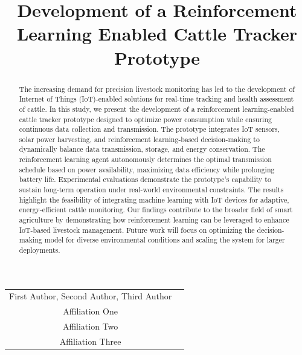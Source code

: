 \documentclass[10pt]{cai}
\begin{document}
\def\conferenceyear{2025}
\begin{center}

\title{Development of a Reinforcement Learning Enabled Cattle Tracker Prototype}
\maketitle

\thispagestyle{empty}

\begin{tabular}{cc}
First Author\upstairs{\affilone,*}, Second Author\upstairs{\affilone}, Third Author\upstairs{\affilthree}
\\[0.25ex]
{\small \upstairs{\affilone} Affiliation One} \\
{\small \upstairs{\affiltwo} Affiliation Two} \\
{\small \upstairs{\affilthree} Affiliation Three} \\
\end{tabular}
  
\vspace*{0.2in}
\end{center}

\begin{abstract}
The increasing demand for precision livestock monitoring has led to the development of Internet of Things (IoT)-enabled solutions for real-time tracking and health assessment of cattle. In this study, we present the development of a reinforcement learning-enabled cattle tracker prototype designed to optimize power consumption while ensuring continuous data collection and transmission. The prototype integrates IoT sensors, solar power harvesting, and reinforcement learning-based decision-making to dynamically balance data transmission, storage, and energy conservation. 
The reinforcement learning agent autonomously determines the optimal transmission schedule based on power availability, maximizing data efficiency while prolonging battery life. Experimental evaluations demonstrate the prototype's capability to sustain long-term operation under real-world environmental constraints. The results highlight the feasibility of integrating machine learning with IoT devices for adaptive, energy-efficient cattle monitoring.
Our findings contribute to the broader field of smart agriculture by demonstrating how reinforcement learning can be leveraged to enhance IoT-based livestock management. Future work will focus on optimizing the decision-making model for diverse environmental conditions and scaling the system for larger deployments.

\end{abstract}
\end{document}
